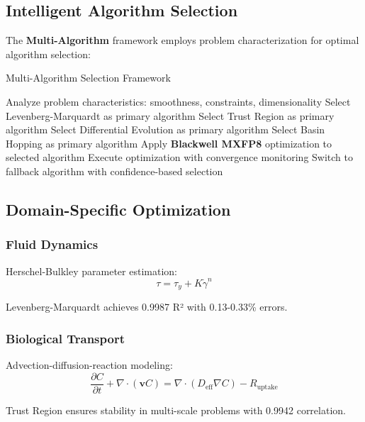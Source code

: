 \documentclass[11pt,a4paper]{article}
\newcommand{\HARDWARE}{\textcolor{hardware}{\textbf{Blackwell MXFP8}}}
\newcommand{\MULTI}{\textcolor{multi}{\textbf{Multi-Algorithm}}}
\newcommand{\RESULT}{\textcolor{resultcolor}{\result}}
\begin{document}
\subsection{Intelligent Algorithm Selection}

The \MULTI{} framework employs problem characterization for optimal algorithm selection:

\begin{algorithm}[H]
\caption{Multi-Algorithm Selection Framework}
\label{alg:multi_selection}
\begin{algorithmic}[1]
\State Analyze problem characteristics: smoothness, constraints, dimensionality
    \State Select Levenberg-Marquardt as primary algorithm
    \State Select Trust Region as primary algorithm
    \State Select Differential Evolution as primary algorithm
    \State Select Basin Hopping as primary algorithm
\EndIf
\State Apply \HARDWARE{} optimization to selected algorithm
\State Execute optimization with convergence monitoring
    \State Switch to fallback algorithm with confidence-based selection
\EndIf
\end{algorithmic}
\end{algorithm}

\subsection{Domain-Specific Optimization}

\subsubsection{Fluid Dynamics}
Herschel-Bulkley parameter estimation:
\[\tau = \tau_y + K \dot{\gamma}^n\]

Levenberg-Marquardt achieves \RESULT{0.9987} R² with 0.13-0.33\% errors.

\subsubsection{Biological Transport}
Advection-diffusion-reaction modeling:
\[\frac{\partial C}{\partial t} + \nabla \cdot (\mathbf{v}C) = \nabla \cdot (D_{\text{eff}} \nabla C) - R_{\text{uptake}}\]

Trust Region ensures stability in multi-scale problems with \RESULT{0.9942} correlation.
\end{document}
